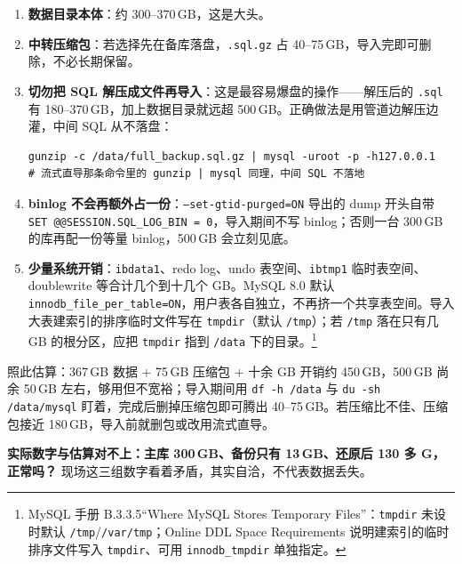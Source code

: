 \documentclass[12pt,UTF8]{ctexbook}
\begin{document}
\begin{enumerate}[leftmargin=2cm]
  \item \textbf{数据目录本体}：约 300--370\,GB，这是大头。
  \item \textbf{中转压缩包}：若选择先在备库落盘，\texttt{.sql.gz} 占 40--75\,GB，导入完即可删除，不必长期保留。
  \item \textbf{切勿把 SQL 解压成文件再导入}：这是最容易爆盘的操作——解压后的 \texttt{.sql} 有 180--370\,GB，加上数据目录就远超 500\,GB。正确做法是用管道边解压边灌，中间 SQL 从不落盘：
\begin{lstlisting}
gunzip -c /data/full_backup.sql.gz | mysql -uroot -p -h127.0.0.1
# 流式直导那条命令里的 gunzip | mysql 同理，中间 SQL 不落地
\end{lstlisting}
  \item \textbf{binlog 不会再额外占一份}：\texttt{--set-gtid-purged=ON} 导出的 dump 开头自带 \texttt{SET @@SESSION.SQL\_LOG\_BIN = 0}，导入期间不写 binlog；否则一台 300\,GB 的库再配一份等量 binlog，500\,GB 会立刻见底。
  \item \textbf{少量系统开销}：\texttt{ibdata1}、redo log、undo 表空间、\texttt{ibtmp1} 临时表空间、doublewrite 等合计几个到十几个 GB。MySQL 8.0 默认 \texttt{innodb\_file\_per\_table=ON}，用户表各自独立，不再挤一个共享表空间。导入大表建索引的排序临时文件写在 \texttt{tmpdir}（默认 \texttt{/tmp}）；若 \texttt{/tmp} 落在只有几 GB 的根分区，应把 \texttt{tmpdir} 指到 \texttt{/data} 下的目录。\footnote{MySQL 手册 B.3.3.5“Where MySQL Stores Temporary Files”：\texttt{tmpdir} 未设时默认 \texttt{/tmp}/\texttt{/var/tmp}；Online DDL Space Requirements 说明建索引的临时排序文件写入 \texttt{tmpdir}、可用 \texttt{innodb\_tmpdir} 单独指定。}
\end{enumerate}

照此估算：367\,GB 数据 + 75\,GB 压缩包 + 十余 GB 开销约 450\,GB，500\,GB 尚余 50\,GB 左右，够用但不宽裕；导入期间用 \texttt{df -h /data} 与 \texttt{du -sh /data/mysql} 盯着，完成后删掉压缩包即可腾出 40--75\,GB。若压缩比不佳、压缩包接近 180\,GB，导入前就删包或改用流式直导。

\textbf{实际数字与估算对不上：主库 300\,GB、备份只有 13\,GB、还原后 130 多 G，正常吗？} 现场这三组数字看着矛盾，其实自洽，不代表数据丢失。
\end{document}
